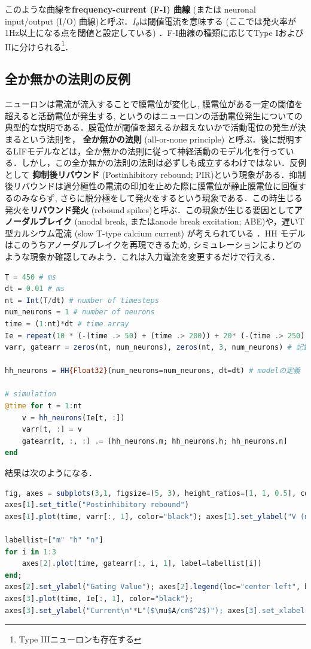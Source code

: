 このような曲線を\textbf{frequency-current (F-I) 曲線} (または neuronal input/output (I/O) 曲線)と呼ぶ．$I_\theta$は閾値電流を意味する (ここでは発火率が1Hz以上になる点を閾値と設定している) ．F-I曲線の種類に応じてType IおよびIIに分けられる\footnote{Type IIIニューロンも存在する}．
\subsection{全か無かの法則の反例}
ニューロンは電流が流入することで膜電位が変化し, 膜電位がある一定の閾値を超えると活動電位が発生する, というのはニューロンの活動電位発生についての典型的な説明である．膜電位が閾値を超えるか超えないかで活動電位の発生が決まるという法則を， \textbf{全か無かの法則} (all-or-none principle) と呼ぶ．後に説明するLIFモデルなどは，全か無かの法則に従って神経活動のモデル化を行っている．しかし，この全か無かの法則の法則は必ずしも成立するわけではない．反例として \textbf{抑制後リバウンド} (Postinhibitory rebound; PIR)という現象がある．抑制後リバウンドは過分極性の電流の印加を止めた際に膜電位が静止膜電位に回復するのみならず, さらに脱分極をして発火をするという現象である．この時生じる発火を\textbf{リバウンド発火} (rebound spikes)と呼ぶ．この現象が生じる要因として\textbf{アノーダルブレイク} (anodal break, またはanode break excitation; ABE)や，遅いT型カルシウム電流 (slow T-type calcium current) が考えられている \citep{Chik2004-ka}．HH モデルはこのうちアノーダルブレイクを再現できるため, シミュレーションによりどのような現象か確認してみよう．これは入力電流を変更するだけで行える．
\begin{lstlisting}[language=julia]
T = 450 # ms
dt = 0.01 # ms
nt = Int(T/dt) # number of timesteps
num_neurons = 1 # number of neurons
time = (1:nt)*dt # time array
Ie = repeat(10 * (-(time .> 50) + (time .> 200)) + 20* (-(time .> 250) + (time .> 400)), 1, num_neurons)  # injection current
varr, gatearr = zeros(nt, num_neurons), zeros(nt, 3, num_neurons) # 記録用

hh_neurons = HH{Float32}(num_neurons=num_neurons, dt=dt) # modelの定義

# simulation
@time for t = 1:nt
    v = hh_neurons(Ie[t, :])
    varr[t, :] = v
    gatearr[t, :, :] .= [hh_neurons.m; hh_neurons.h; hh_neurons.n]
end
\end{lstlisting}
結果は次のようになる．
\begin{lstlisting}[language=julia]
fig, axes = subplots(3,1, figsize=(5, 3), height_ratios=[1, 1, 0.5], constrained_layout=true) 
axes[1].set_title("Postinhibitory rebound")
axes[1].plot(time, varr[:, 1], color="black"); axes[1].set_ylabel("V (mV)")

labellist=["m" "h" "n"] 
for i in 1:3
    axes[2].plot(time, gatearr[:, i, 1], label=labellist[i])
end; 
axes[2].set_ylabel("Gating Value"); axes[2].legend(loc="center left", bbox_to_anchor=(1, 0.5))
axes[3].plot(time, Ie[:, 1], color="black"); 
axes[3].set_ylabel("Current\n"*L"($\mu$A/cm$^2$)"); axes[3].set_xlabel("Times (ms)")
\end{lstlisting}
